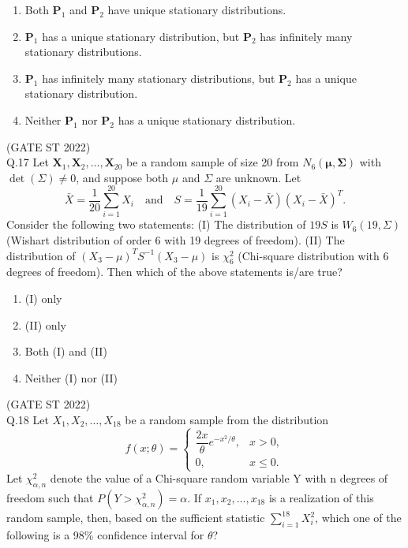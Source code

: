 \documentclass[journal,12pt,onecolumn]{IEEEtran}
\theoremstyle{remark}
\begin{document}
\begin{enumerate}[label=\alph*.] 
	\item Both $\textbf{P}_1$ and $\textbf{P}_2$ have unique stationary distributions.
	\item $\textbf{P}_1$ has a unique stationary distribution, but $\textbf{P}_2$ has infinitely many stationary distributions.
	\item $\textbf{P}_1$ has infinitely many stationary distributions, but $\textbf{P}_2$ has a unique stationary distribution.
	\item Neither $\textbf{P}_1$ nor $\textbf{P}_2$ has a unique stationary distribution.

\end{enumerate}
	\hfill (GATE ST 2022)\\
	\vspace{2em}
Q.17 Let $\textbf{X}_1, \textbf{X}_2, \dots, \textbf{X}_{20}$ be a random sample of size 20 from $N_6(\mathbf{\mu,\Sigma})$ with $\det(\Sigma) \neq 0$, and suppose both $\mu$ and $\Sigma$ are unknown. Let 
$$
\bar{X} = \frac{1}{20}\sum_{i=1}^{20} X_i 
\quad \text{and} \quad
S = \frac{1}{19} \sum_{i=1}^{20} (X_i - \bar{X})(X_i - \bar{X})^T.
$$ 
Consider the following two statements:
(I) The distribution of $19S$ is $W_6(19,\Sigma)$ (Wishart distribution of order 6 with 19 degrees of freedom).
(II) The distribution of $(X_3 - \mu)^T S^{-1}(X_3 - \mu)$ is $\chi^2_6$ (Chi-square distribution with 6 degrees of freedom).
Then which of the above statements is/are true?
\begin{multicols}{4}
\begin{enumerate}[label=\alph*.] 
	\item (I) only
	\item (II) only
	\item Both (I) and (II)
	\item Neither (I) nor (II)

\end{enumerate}
\end{multicols}
	\hfill (GATE ST 2022)\\
	\vspace{2em}
Q.18 Let $X_1, X_2, \dots, X_{18}$ be a random sample from the distribution
\[
f(x; \theta) =
\begin{cases}
	\dfrac{2x}{\theta} e^{-x^2/\theta}, & x > 0, \\[4pt]
	0, & x \leq 0.
\end{cases}
\]
Let $\chi^2_{\alpha,n}$ denote the value of a Chi-square random variable Y with n degrees of freedom such that $P(Y > \chi^2_{\alpha, n}) = \alpha$. If $x_1, x_2, \dots, x_{18}$ is a realization of this random sample, then, based on the sufficient statistic $\sum_{i = 1}^{18} X^2_i$, which one of the following is a 98\% confidence interval for $\theta$?
\end{document}
